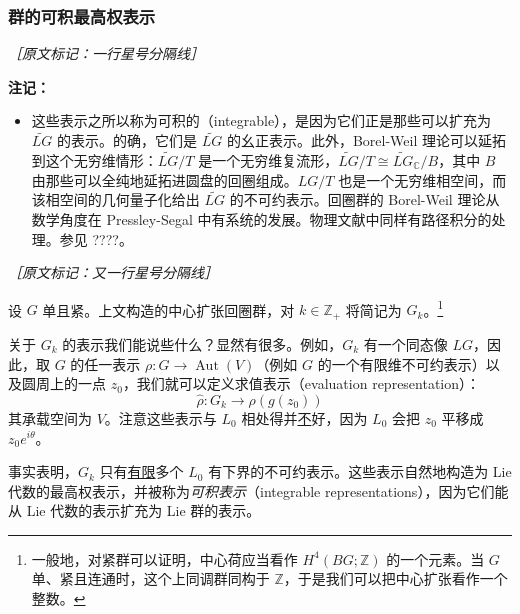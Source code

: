 
\subsubsection{群的可积最高权表示} %

{\small\itshape ［原文标记：一行星号分隔线］}

\textbf{注记：}

\begin{itemize}
  \item 这些表示之所以称为可积的（integrable），是因为它们正是那些可以扩充为 $\widetilde{LG}$ 的表示。的确，它们是 $\widetilde{LG}$ 的幺正表示。此外，Borel-Weil 理论可以延拓到这个无穷维情形：$\widetilde{LG}/T$ 是一个无穷维复流形，$\widetilde{LG}/T\cong\widetilde{LG}_{\mathbb{C}}/B$，其中 $B$ 由那些可以全纯地延拓进圆盘的回圈组成。$LG/T$ 也是一个无穷维相空间，而该相空间的几何量子化给出 $\widetilde{LG}$ 的不可约表示。回圈群的 Borel-Weil 理论从数学角度在 Pressley-Segal 中有系统的发展。物理文献中同样有路径积分的处理。参见 ????。
\end{itemize}

{\small\itshape ［原文标记：又一行星号分隔线］}

设 $G$ 单且紧。上文构造的中心扩张回圈群，对 $k\in\mathbb{Z}_+$ 将简记为 $G_k$。\footnote{一般地，对紧群可以证明，中心荷应当看作 $H^4(BG;\mathbb{Z})$ 的一个元素。当 $G$ 单、紧且连通时，这个上同调群同构于 $\mathbb{Z}$，于是我们可以把中心扩张看作一个整数。}

关于 $G_k$ 的表示我们能说些什么？显然有很多。例如，$G_k$ 有一个同态像 $LG$，因此，取 $G$ 的任一表示 $\rho:G\to\operatorname{Aut}(V)$（例如 $G$ 的一个有限维不可约表示）以及圆周上的一点 $z_0$，我们就可以定义求值表示（evaluation representation）：
\begin{equation}
  \widehat{\rho}: G_k \to \rho(g(z_0))
  \tag{4.147}
  \label{eq:4.147}
\end{equation}
其承载空间为 $V$。注意这些表示与 $L_0$ 相处得并\underline{不}好，因为 $L_0$ 会把 $z_0$ 平移成 $z_0e^{i\theta}$。

事实表明，$G_k$ 只有\underline{有限}多个 $L_0$ 有下界的不可约表示。这些表示自然地构造为 Lie 代数的最高权表示，并被称为\emph{可积表示}（integrable representations），因为它们能从 Lie 代数的表示扩充为 Lie 群的表示。

